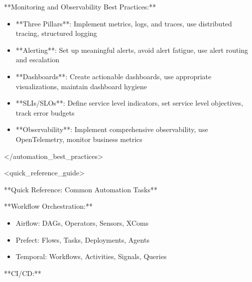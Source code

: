 \documentclass[11pt,a4paper]{article}
\begin{document}
**Monitoring and Observability Best Practices:**

\begin{itemize}
\item **Three Pillars**: Implement metrics, logs, and traces, use distributed tracing, structured logging
\end{itemize}

\begin{itemize}
\item **Alerting**: Set up meaningful alerts, avoid alert fatigue, use alert routing and escalation
\end{itemize}

\begin{itemize}
\item **Dashboards**: Create actionable dashboards, use appropriate visualizations, maintain dashboard hygiene
\end{itemize}

\begin{itemize}
\item **SLIs/SLOs**: Define service level indicators, set service level objectives, track error budgets
\end{itemize}

\begin{itemize}
\item **Observability**: Implement comprehensive observability, use OpenTelemetry, monitor business metrics
\end{itemize}

</automation\_best\_practices>

<quick\_reference\_guide>

**Quick Reference: Common Automation Tasks**

**Workflow Orchestration:**

\begin{itemize}
\item Airflow: DAGs, Operators, Sensors, XComs
\end{itemize}

\begin{itemize}
\item Prefect: Flows, Tasks, Deployments, Agents
\end{itemize}

\begin{itemize}
\item Temporal: Workflows, Activities, Signals, Queries
\end{itemize}

**CI/CD:**
\end{document}
